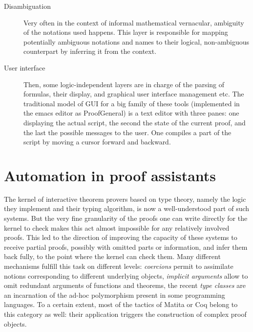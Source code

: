 \documentclass[twoside,a4paper,12pt]{article}
\begin{document}
\begin{description}
\item[Disambiguation] Very often in the context of informal
  mathematical vernacular, ambiguity of the notations used happens.
  This layer is responsible for mapping potentially ambiguous
  notations and names to their logical, non-ambiguous counterpart by
  inferring it from the context.

\item[User interface] Then, some logic-independent layers are in
  charge of the parsing of formulas, their display, and graphical user
  interface management etc. The traditional model of GUI for a big
  family of these tools (implemented in the emacs editor as
  \textsf{ProofGeneral}) is a text editor with three panes: one
  displaying the actual script, the second the state of the current
  proof, and the last the possible messages to the user. One compiles
  a part of the script by moving a cursor forward and backward.
\end{description}

\newpage

\section{Automation in proof assistants}
\label{sec:auto}

The kernel of interactive theorem provers based on type theory, namely
the logic they implement and their typing algorithm, is now a
well-understood part of such systems. But the very fine granularity of
the proofs one can write directly for the kernel to check makes this
act almost impossible for any relatively involved proofs. This led to
the direction of improving the capacity of these systems to receive
partial proofs, possibly with omitted parts or information, and infer
them back fully, to the point where the kernel can check them. Many
different mechanisms fulfill this task on different levels:
\emph{coercions} permit to assimilate notions corresponding to
different underlying objects, \emph{implicit arguments} allow to omit
redundant arguments of functions and theorems, the recent \emph{type
  classes} are an incarnation of the ad-hoc polymorphism present in
some programming languages. To a certain extent, most of the tactics
of \textsf{Matita} or \textsf{Coq} belong to this category as well:
their application triggers the construction of complex proof objects.
\end{document}
